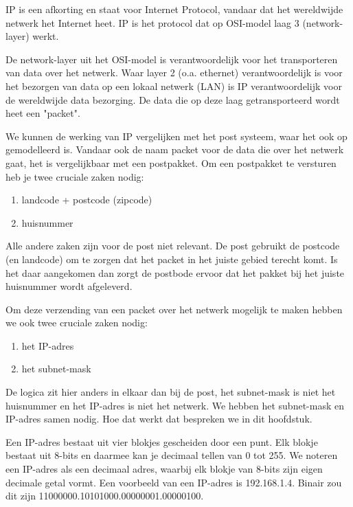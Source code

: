 IP is een afkorting en staat voor Internet Protocol, vandaar dat het wereldwijde netwerk het Internet heet. IP is het protocol dat op OSI-model laag 3 (network-layer) werkt.

De network-layer uit het OSI-model is verantwoordelijk voor het transporteren van data over het netwerk. Waar layer 2 (o.a. ethernet) verantwoordelijk is voor het bezorgen van data op een lokaal netwerk (LAN) is IP verantwoordelijk voor de wereldwijde data bezorging. De data die op deze laag getransporteerd wordt heet een "packet".

We kunnen de werking van IP vergelijken met het post systeem, waar het ook op gemodelleerd is. Vandaar ook de naam packet voor de data die over het netwerk gaat, het is vergelijkbaar met een postpakket. Om een postpakket te versturen heb je twee cruciale zaken nodig:
\begin{enumerate}
\item landcode + postcode (zipcode)
\item huisnummer
\end{enumerate}
Alle andere zaken zijn voor de post niet relevant. De post gebruikt de postcode (en landcode) om te zorgen dat het packet in het juiste gebied terecht komt. Is het daar aangekomen dan zorgt de postbode ervoor dat het pakket bij het juiste huisnummer wordt afgeleverd.

Om deze verzending van een packet over het netwerk mogelijk te maken hebben we ook twee cruciale zaken nodig:
\begin{enumerate}
\item het IP-adres
\item het subnet-mask
\end{enumerate}
De logica zit hier anders in elkaar dan bij de post, het subnet-mask is niet het huisnummer en het IP-adres is niet het netwerk. We hebben het subnet-mask en IP-adres samen nodig. Hoe dat werkt dat bespreken we in dit hoofdstuk.

Een IP-adres bestaat uit vier blokjes gescheiden door een punt. Elk blokje bestaat uit 8-bits en daarmee kan je decimaal tellen van 0 tot 255. We noteren een IP-adres als een decimaal adres, waarbij elk blokje van 8-bits zijn eigen decimale getal vormt. Een voorbeeld van een IP-adres is 192.168.1.4. Binair zou dit zijn 11000000.10101000.00000001.00000100.

